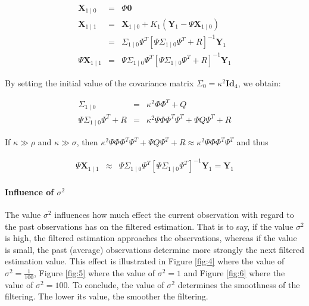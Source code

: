 \documentclass[a4paper, 12pt, titlepage]{article}
\begin{document}
\begin{eqnarray}
	\pmb{X}_{1\mid 0} &=& \Phi \pmb{0} \\
	\pmb{X}_{1\mid 1} &=& \pmb{X}_{1\mid 0} + K_1(\pmb{Y}_1 -\Psi \pmb{X}_{1\mid 0})\\
	&=& \Sigma_{1\mid 0} \Psi^T \left[ \Psi\Sigma_{1\mid 0} \Psi^T +R \right]^{-1}\pmb{Y}_1\\
	\Psi\pmb{X}_{1\mid 1} &=& \Psi \Sigma_{1\mid 0} \Psi^T \left[ \Psi\Sigma_{1\mid 0} \Psi^T +R \right]^{-1}\pmb{Y}_1
\end{eqnarray}

By setting the initial value of the covariance matrix $\Sigma_0=\kappa^2 \pmb{Id}_4$, we obtain:

\begin{eqnarray}
	\Sigma_{1\mid 0} &=& \kappa^2\Phi \Phi^T + Q\\
	\Psi \Sigma_{1\mid 0} \Psi^T + R &=& \kappa^2 \Psi \Phi \Phi^T \Psi^T + \Psi Q \Psi^T + R
\end{eqnarray}

If $\kappa \gg \rho$ and $\kappa \gg \sigma$, then $\kappa^2 \Psi \Phi \Phi^T \Psi^T + \Psi Q \Psi^T + R \approx \kappa^2 \Psi \Phi \Phi^T \Psi^T$ and thus

\begin{eqnarray}
	\Psi\pmb{X}_{1\mid 1} &\approx& \Psi \Sigma_{1\mid 0} \Psi^T \left[ \Psi\Sigma_{1\mid 0} \Psi^T \right]^{-1}\pmb{Y}_1 = \pmb{Y}_1 
\end{eqnarray}

\paragraph{Influence of $\sigma^2$}

The value $\sigma^2$ influences how much effect the current observation with regard to the past observations has on the filtered estimation. 
That is to say, if the value $\sigma^2$ is high, the filtered estimation approaches the observations, whereas if the value is small, the past (average) observations determine more strongly the next filtered estimation value. 
This effect is illustrated in Figure \ref{fig:4} where the value of $\sigma^2=\frac{1}{100}$, Figure \ref{fig:5} where the value of $\sigma^2=1$ and Figure \ref{fig:6} where the value of $\sigma^2=100$. 
To conclude, the value of $\sigma^2$ determines the smoothness of the filtering. 
The lower its value, the smoother the filtering.
\end{document}
